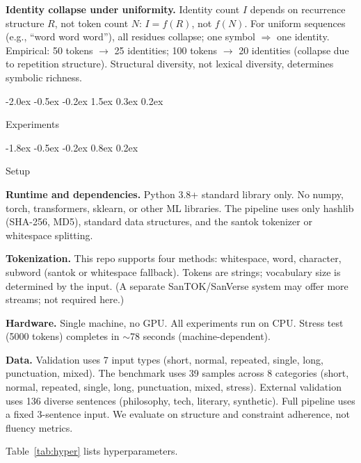 \documentclass[10pt]{article}
\makeatletter
\renewcommand{\section}{\@startsection{section}{1}{\z@}%
  {-2.0ex \@plus -0.5ex \@minus -0.2ex}%
  {1.5ex \@plus 0.3ex \@minus 0.2ex}%
  {\large\bfseries\raggedright}}
\renewcommand{\subsection}{\@startsection{subsection}{2}{\z@}%
  {-1.8ex \@plus -0.5ex \@minus -0.2ex}%
  {0.8ex \@plus 0.2ex}%
  {\normalsize\bfseries\raggedright}}
\makeatother
\begin{document}
\textbf{Identity collapse under uniformity.}
Identity count $I$ depends on recurrence structure $R$, not token count $N$: $I = f(R)$, not $f(N)$. For uniform sequences (e.g., ``word word word''), all residues collapse; one symbol $\Rightarrow$ one identity. Empirical: 50 tokens $\rightarrow$ 25 identities; 100 tokens $\rightarrow$ 20 identities (collapse due to repetition structure). Structural diversity, not lexical diversity, determines symbolic richness.

\section{Experiments}
\label{sec:exp}

\subsection{Setup}

\textbf{Runtime and dependencies.}
Python 3.8+ standard library only. No numpy, torch, transformers, sklearn, or other ML libraries. The pipeline uses only hashlib (SHA-256, MD5), standard data structures, and the santok tokenizer or whitespace splitting.

\textbf{Tokenization.}
This repo supports four methods: whitespace, word, character, subword (santok or whitespace fallback). Tokens are strings; vocabulary size is determined by the input. (A separate SanTOK/SanVerse system may offer more streams; not required here.)

\textbf{Hardware.}
Single machine, no GPU. All experiments run on CPU. Stress test (5000 tokens) completes in $\sim$78 seconds (machine-dependent).

\textbf{Data.}
Validation uses 7 input types (short, normal, repeated, single, long, punctuation, mixed). The benchmark uses 39 samples across 8 categories (short, normal, repeated, single, long, punctuation, mixed, stress). External validation uses 136 diverse sentences (philosophy, tech, literary, synthetic). Full pipeline uses a fixed 3-sentence input. We evaluate on structure and constraint adherence, not fluency metrics.

Table~\ref{tab:hyper} lists hyperparameters.
\end{document}

